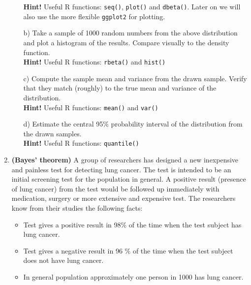 \documentclass[11pt,a4paper,english]{article}\usepackage[]{graphicx}\usepackage[]{xcolor}
\begin{document}
\begin{enumerate}
\begin{itemize}
 \textbf{Hint!} Useful R functions: {\tt seq()}, {\tt plot()} and {\tt dbeta()}. Later on we will also use the more flexible {\tt ggplot2} for plotting.

    \item[b)] Take a sample of 1000 random numbers from the above distribution and plot a histogram of the results. Compare visually to the density function.\\
    \textbf{Hint!} Useful R functions: {\tt rbeta()} and {\tt hist()}
    \item[c)] Compute the sample mean and variance from the drawn sample. Verify that they match (roughly) to the true mean and variance of the distribution.\\
\textbf{Hint!} Useful R functions: {\tt mean()} and {\tt var()}
    \item[d)] Estimate the central 95\% probability interval of the distribution from the drawn samples.\\
\textbf{Hint!} Useful R functions: {\tt quantile()}
\end{itemize}



\item {\bf (Bayes' theorem)} A group of researchers has designed a new inexpensive and
  painless test for detecting lung cancer. The test is
  intended to be an initial screening test for the population in
  general. A positive result (presence of lung cancer) from the test
  would be followed up immediately with medication, surgery or more
  extensive and expensive test. The researchers know from their
  studies the following facts:
  \begin{itemize}
  \item Test gives a positive result in 98$\%$  of the time when the
    test subject has lung cancer.
  \item Test gives a negative result in 96 $\%$ of the time when the
    test subject does not have lung cancer.
  \item In general population approximately one person in 1000 has
    lung cancer.
  \end{itemize}


\end{enumerate}
\end{document}

